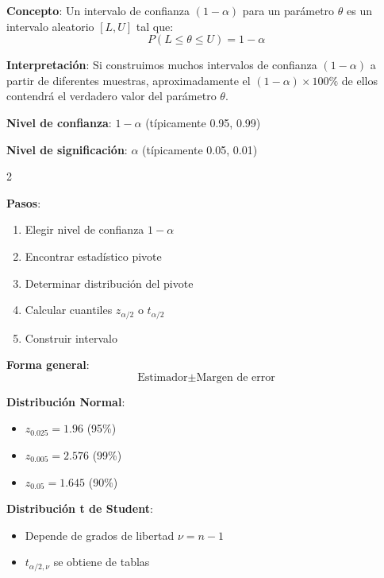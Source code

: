 \documentclass[10pt,a4paper]{article}
\begin{document}
\pagebreak


\begin{tcolorbox}[title=Definición de Intervalo de Confianza]
    \textbf{Concepto}: Un intervalo de confianza $(1-\alpha)$ para un parámetro $\theta$ es un intervalo aleatorio $[L, U]$ tal que:
    \[
        P(L \leq \theta \leq U) = 1 - \alpha
    \]
    
    \textbf{Interpretación}: Si construimos muchos intervalos de confianza $(1-\alpha)$ a partir de diferentes muestras, aproximadamente el $(1-\alpha) \times 100\%$ de ellos contendrá el verdadero valor del parámetro $\theta$.
    
    \textbf{Nivel de confianza}: $1-\alpha$ (típicamente 0.95, 0.99)
    
    \textbf{Nivel de significación}: $\alpha$ (típicamente 0.05, 0.01)
\end{tcolorbox}

\begin{multicols}{2}
    \begin{tcolorbox}[title=Construcción de I.C., equal height group=IC1]
        \textbf{Pasos}:
        \begin{enumerate}
            \item Elegir nivel de confianza $1-\alpha$
            \item Encontrar estadístico pivote
            \item Determinar distribución del pivote
            \item Calcular cuantiles $z_{\alpha/2}$ o $t_{\alpha/2}$
            \item Construir intervalo
        \end{enumerate}
        
        \textbf{Forma general}:
        \[
            \text{Estimador} \pm \text{Margen de error}
        \]
    \end{tcolorbox}
    \begin{tcolorbox}[title=Cuantiles Importantes, equal height group=IC1]
        \textbf{Distribución Normal}:
        \begin{itemize}
            \item $z_{0.025} = 1.96$ (95\%)
            \item $z_{0.005} = 2.576$ (99\%)
            \item $z_{0.05} = 1.645$ (90\%)
        \end{itemize}
        
        \textbf{Distribución t de Student}:
        \begin{itemize}
            \item Depende de grados de libertad $\nu = n-1$
            \item $t_{\alpha/2, \nu}$ se obtiene de tablas
        \end{itemize}
    \end{tcolorbox}
\end{multicols}
\end{document}
